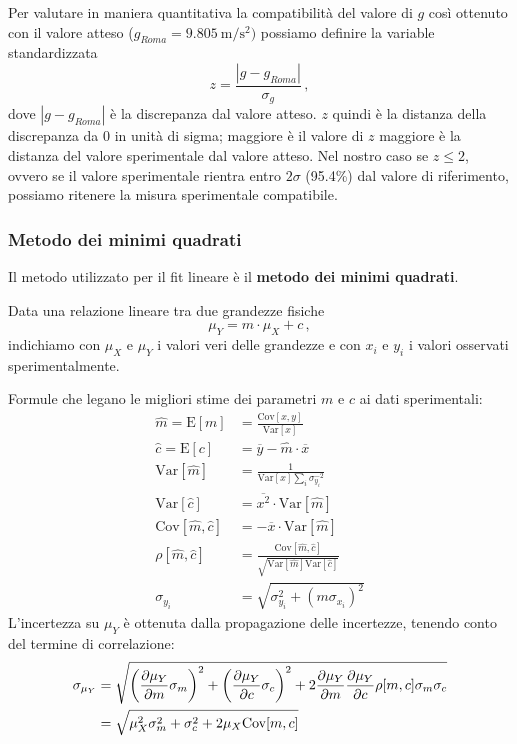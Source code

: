 \documentclass[titlepage]{article}
\numberwithin{equation}{section}
\numberwithin{figure}{section}
\numberwithin{table}{section}
\begin{document}
Per valutare in maniera quantitativa la compatibilità del valore di $g$ così ottenuto con il valore atteso ($g_{Roma} = \SI{9.805}{\metre\per\second\squared})$ possiamo definire la variable standardizzata
\begin{equation}
  z = \frac{|g - g_{Roma}|}{\sigma_g} \,,
\end{equation}
dove $|g - g_{Roma}|$ è la discrepanza dal valore atteso. $z$ quindi è la distanza della discrepanza da 0 in unità di sigma; maggiore è il valore di $z$ maggiore è la distanza del valore sperimentale dal valore atteso. Nel nostro caso se $z \leq 2$, ovvero se il valore sperimentale rientra entro $2 \sigma$ (95.4\%) dal valore di riferimento, possiamo ritenere la misura sperimentale compatibile.

\subsubsection{Metodo dei minimi quadrati}

Il metodo utilizzato per il fit lineare è il \textbf{metodo dei minimi quadrati}.

\bigskip

\noindent Data una relazione lineare tra due grandezze fisiche
\begin{equation}
  \mu_Y = m \cdot \mu_X + c \,,
\end{equation}
indichiamo con $\mu_X$ e $\mu_Y$ i valori veri delle grandezze e con $x_i$ e $y_i$ i valori osservati sperimentalmente.

Formule che legano le migliori stime dei parametri $m$ e $c$ ai dati sperimentali:
\begin{align}
  \hat{m} = \text{E}[m] &= \frac{\text{Cov}[x,y]}{\text{Var}[x]} \\
  \hat{c} = \text{E}[c] &= \overline{y} - \hat{m} \cdot \overline{x} \\
  \text{Var}[\hat{m}] &= \frac{1}{\text{Var}[x] \sum_i \sigma_{y_i}^{-2}} \\
  \text{Var}[\hat{c}] &= \overline{x^2} \cdot \text{Var}[\hat{m}] \\
  \text{Cov}[\hat{m},\hat{c}] &= -\overline{x} \cdot \text{Var}[\hat{m}] \\
  \rho[\hat{m},\hat{c}] &= \frac{\text{Cov}[\hat{m},\hat{c}]}{\sqrt{\text{Var}[\hat{m}] \text{Var}[\hat{c}]}} \\
  \sigma_{y_i} &= \sqrt{\sigma_{y_i}^2 + (m \sigma_{x_i})^2} \label{eq:sigma_y}
\end{align}
L'incertezza su $\mu_Y$ è ottenuta dalla propagazione delle incertezze, tenendo conto del termine di correlazione:
\begin{align}
  \sigma_{\mu_Y} &= \sqrt{\left( \diffp{\mu_Y}{m} \sigma_m \right)^2 + \left( \diffp{\mu_Y}{c} \sigma_c \right)^2 + 2 \diffp{\mu_Y}{m} \diffp{\mu_Y}{c} \rho[m,c] \sigma_m \sigma_c} \nonumber \\
  &= \sqrt{\mu_X^2 \sigma_m^2 + \sigma_c^2 + 2 \mu_X \text{Cov}[m,c]}
\end{align}
\end{document}
